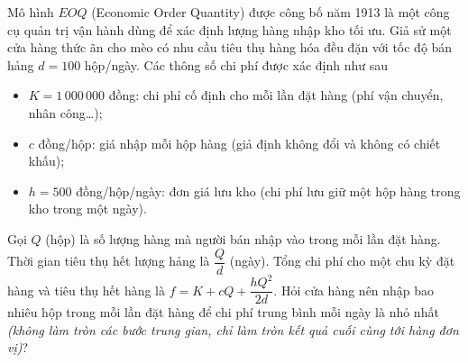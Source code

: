 \begin{ex}%
Mô hình $EOQ$ (Economic Order Quantity) được công bố năm 1913 là một công cụ quản trị vận hành dùng để xác định lượng hàng nhập kho tối ưu. Giả sử một cửa hàng thức ãn cho mèo có nhu cầu tiêu thụ hàng hóa đều đặn với tốc độ bán hảng $d=100$ hộp/ngày. Các thông số chi phí được xác định như sau
\begin{itemize}
\item $K=1\,000\,000$ đồng: chi phỉ cố định cho mỗi lần đặt hàng (phí vận chuyển, nhân công\ldots);
\item $c$ đồng/hộp: giá nhập mỗi hộp hàng (giả định không đổi và không có chiết khấu);
\item $h=500$ đồng/hộp/ngày: đơn giá lưu kho (chi phí lưu giữ một hộp hàng trong kho trong một ngày).
\end{itemize}
Gọi $Q$ (hộp) là số lượng hàng mà người bán nhập vào trong mỗi lần đặt hàng. Thời gian tiêu thụ hết
lượng hảng là $\dfrac{Q}{d}$ (ngày). Tổng chi phí cho một chu kỳ đặt hàng và tiêu thụ hết hàng là $f=K+cQ+\dfrac{hQ^2}{2d}$.
Hỏi cửa hàng nên nhập bao nhiêu hộp trong mỗi lần đặt hàng để chi phí trung bình mỗi ngày là nhỏ nhất \textit{(không làm tròn các bước trung gian, chỉ làm tròn kết quả cuối cùng tới hàng đơn vị)}?
\end{ex}
